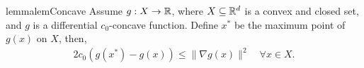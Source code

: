 \begin{restatable}{lemma}{lemConcave}
\label{lem:concave}
Assume $g: X \to \mathbb{R}$, where $X\subseteq \mathbb{R}^d$ is a convex and closed set, and $g$ is a differential $c_0$-concave function. Define $x^*$ be the maximum point of $g(x)$ on $X$, then,
\begin{align*}
    2 c_0 \left( g(x^*) - g(x) \right) \le \| \nabla g(x) \|^2\quad \forall x\in X.
\end{align*}
\end{restatable}